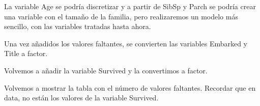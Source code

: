 \documentclass[]{article}
\newenvironment{Shaded}{\begin{snugshade}}{\end{snugshade}}
\newcommand{\KeywordTok}[1]{\textcolor[rgb]{0.13,0.29,0.53}{\textbf{#1}}}
\newcommand{\DataTypeTok}[1]{\textcolor[rgb]{0.13,0.29,0.53}{#1}}
\newcommand{\StringTok}[1]{\textcolor[rgb]{0.31,0.60,0.02}{#1}}
\newcommand{\CommentTok}[1]{\textcolor[rgb]{0.56,0.35,0.01}{\textit{#1}}}
\newcommand{\ControlFlowTok}[1]{\textcolor[rgb]{0.13,0.29,0.53}{\textbf{#1}}}
\newcommand{\OperatorTok}[1]{\textcolor[rgb]{0.81,0.36,0.00}{\textbf{#1}}}
\newcommand{\NormalTok}[1]{#1}
\begin{document}
La variable Age se podría discretizar y a partir de SibSp y Parch se
podría crear una variable con el tamaño de la familia, pero realizaremos
un modelo más sencillo, con las variables tratadas hasta ahora.

Una vez añadidos los valores faltantes, se convierten las variables
Embarked y Title a factor.

\begin{Shaded}
\end{Shaded}

Volvemos a añadir la variable Survived y la convertimos a factor.

\begin{Shaded}
\end{Shaded}

Volvemos a mostrar la tabla con el número de valores faltantes. Recordar
que en data, no están los valores de la variable Survived.

\begin{Shaded}
\end{Shaded}
\end{document}
